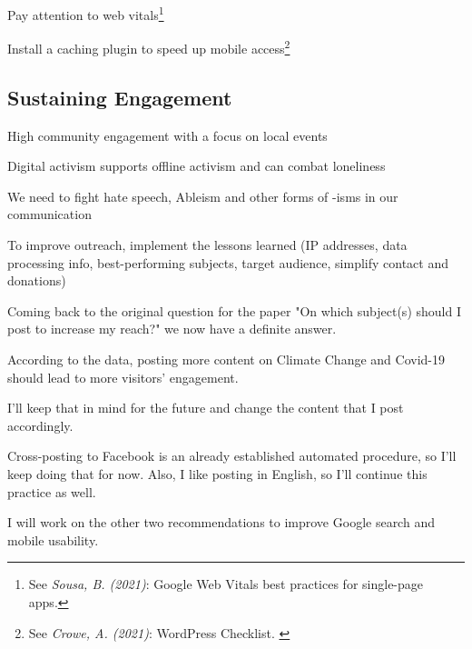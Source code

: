 Pay attention to web vitals\footnote{See \textit{Sousa, B. (2021)}: Google Web Vitals best practices for single-page apps.\cite{webVitals}}

Install a caching plugin to speed up mobile access\footnote{See \textit{Crowe, A. (2021)}: WordPress Checklist. \cite{wpCachePlugin}}

\subsection{Sustaining Engagement}

High community engagement with a focus on local events

Digital activism supports offline activism and can combat loneliness

We need to fight hate speech, Ableism and other forms of -isms in our communication

To improve outreach, implement the lessons learned (IP addresses, data processing info, best-performing subjects, target audience, simplify contact and donations)

Coming back to the original question for the paper "On which subject(s) should I post to increase my reach?" we now have a definite answer.

According to the data, posting more content on Climate Change and Covid-19 should lead to more visitors' engagement.

I'll keep that in mind for the future and change the content that I post accordingly.

Cross-posting to Facebook is an already established automated procedure, so I'll keep doing that for now. Also, I like posting in English, so I'll continue this practice as well.

I will work on the other two recommendations to improve Google search and mobile usability.
